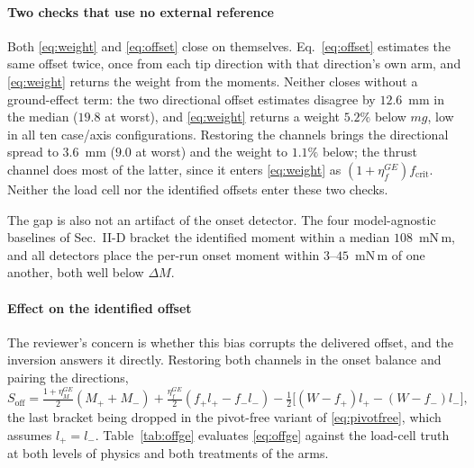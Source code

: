 \paragraph{Two checks that use no external reference}
Both \eqref{eq:weight} and \eqref{eq:offset} close on themselves.
Eq.~\eqref{eq:offset} estimates the same offset twice, once from each
tip direction with that direction's own arm, and \eqref{eq:weight}
returns the weight from the moments. Neither closes without a
ground-effect term: the two directional offset estimates disagree by
$12.6$~mm in the median ($19.8$ at worst), and \eqref{eq:weight}
returns a weight $5.2\%$ below $mg$, low in all ten case/axis
configurations. Restoring the channels brings the directional spread
to $3.6$~mm ($9.0$ at worst) and the weight to $1.1\%$ below; the
thrust channel does most of the latter, since it enters
\eqref{eq:weight} as $(1+\eta_f^{GE})f_{\mathrm{crit}}$. Neither the
load cell nor the identified offsets enter these two checks.

The gap is also not an artifact of the onset detector. The four
model-agnostic baselines of Sec.~II-D bracket the identified moment
within a median $108$~mN\,m, and all detectors place the per-run onset
moment within $3$--$45$~mN\,m of one another, both well below
$\Delta M$.

\paragraph{Effect on the identified offset}
The reviewer's concern is whether this bias corrupts the delivered
offset, and the inversion answers it directly. Restoring both channels
in the onset balance and pairing the directions,
\begin{equation}
S_{\mathrm{off}} = \tfrac{1+\eta_M^{GE}}{2}(M_+ + M_-)
+ \tfrac{\eta_f^{GE}}{2}(f_+ l_+ - f_- l_-)
- \tfrac12\big[(W - f_+)l_+ - (W - f_-)l_-\big],
\label{eq:offge}
\end{equation}
the last bracket being dropped in the pivot-free variant of
\eqref{eq:pivotfree}, which assumes $l_+ = l_-$. Table~\ref{tab:offge}
evaluates \eqref{eq:offge} against the load-cell truth at both levels
of physics and both treatments of the arms.

